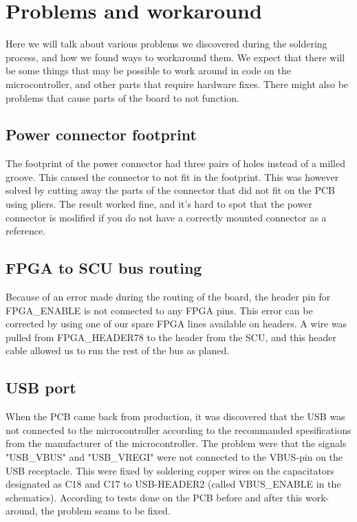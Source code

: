\section {Problems and workaround}
Here we will talk about various problems we discovered during the soldering process, and how we found ways to workaround them.
We expect that there will be some things that may be possible to work around in code on the microcontroller, and other parts that require hardware fixes.
There might also be problems that cause parts of the board to not function.

\subsection{ Power connector footprint }

The footprint of the power connector had three pairs of holes instead of a milled groove.
This caused the connector to not fit in the footprint.
This was however solved by cutting away the parts of the connector that did not fit on the PCB using pliers.
The result worked fine, and it's hard to spot that the power connector is modified if you do not have a correctly mounted connector as a reference.

\subsection{ FPGA to SCU bus routing }

Because of an error made during the routing of the board, the header pin for FPGA\_ENABLE is not connected to any FPGA pins.
This error can be corrected by using one of our spare FPGA lines available on headers.
A wire was pulled from FPGA\_HEADER78 to the header from the SCU, and this header cable allowed us to run the rest of the bus as planed.

\subsection{ USB port }
When the PCB came back from production, it was discovered that the USB was not connected to the microcontroller
according to the recommanded spesifications from the manufacturer of the microcontroller. 
The problem were that the signals "USB_VBUS" and "USB_VREGI" were not connected to the VBUS-pin on the USB receptacle. This were fixed by soldering copper wires on the capacitators designated as C18 and C17 to USB-HEADER2 (called VBUS_ENABLE in the schematics).
According to tests done on the PCB before and after this work-around, the problem seams to be fixed.


